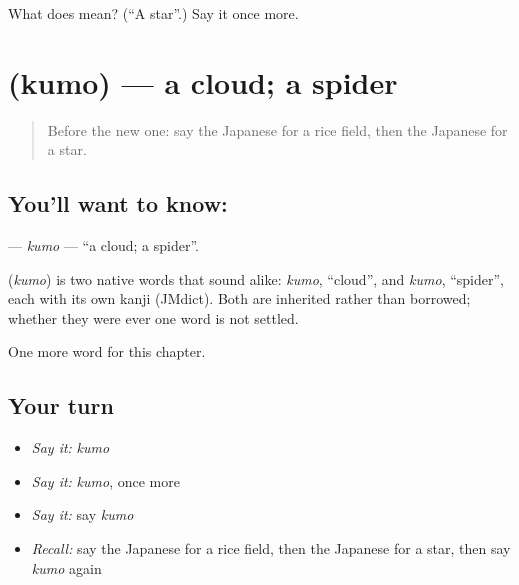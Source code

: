 \begin{tcolorbox}[breakable,colback=teal!4,colframe=teal!35!black,title={Before you move on}]
What does  mean? (\textquotedblleft{}A star\textquotedblright{}.) Say it once more.
\end{tcolorbox}
\section[\texorpdfstring{\ja{くも} (kumo)}{くも (kumo)}]{ (kumo) — a cloud; a spider}

\label{lesson:JA-C43-kumo}



\begin{quote}
Before the new one: say the Japanese for a rice field, then the Japanese for a star.
\end{quote}

\subsection*{You'll want to know: }
\textbf{} — \emph{kumo} — \textquotedblleft{}a cloud; a spider\textquotedblright{}.

\begin{cousinweb}
\textbf{} (\emph{kumo}) is two native words that sound alike: \emph{kumo}, \textquotedblleft{}cloud\textquotedblright{}, and \emph{kumo}, \textquotedblleft{}spider\textquotedblright{}, each with its own kanji (JMdict). Both are inherited rather than borrowed; whether they were ever one word is not settled.
\end{cousinweb}

\begin{grammarlens}[title={What you've built}]
One more word for this chapter.
\end{grammarlens}

\subsection*{Your turn}
\begin{itemize}
\raggedright
  \item \emph{Say it:} \emph{kumo}
  \item \emph{Say it:} \emph{kumo}, once more
  \item \emph{Say it:} say \emph{kumo}
  \item \emph{Recall:} say the Japanese for a rice field, then the Japanese for a star, then say \emph{kumo} again
\end{itemize}

